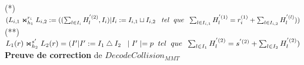 \documentclass[12pt,openany]{report}
\begin{document}
(*)$ (L_{i,1}\Join_{h_1}^{r_i} L_{i,2}:= ((\sum_{l \in I_{i}}H_{l}^{'(2)},I_i)| I_i:=I_{i,1}\sqcup I_{i,2} \hspace{0.3cm}  tel \hspace{0.2cm} que \hspace{0.2cm} \sum_{l \in I_{i,1}} H_{l}^{'(1)}= r_{i}^{(1)} + \sum_{l \in I_{i,2}} H_{l}^{'(l)}))    $\\
(**)  $ L_{1}(r)\Join_{h_2}^{s'}L_{2}(r)=(I' | I':=I_{1}\bigtriangleup I_{2} \hspace{0.2cm} \mid I' \mid=p \hspace{0.2cm} tel \hspace{0.2cm} que \hspace{0.2cm}  \sum_{l \in I_{1}} H_{l}^{'(2)}=s^{'(2)} + \sum_{l \in I_{2}} H_{l}^{'(2)}  )    $\\
\textbf{Preuve de correction} de  $ DecodeCollision_{MMT}  $
\end{document}
